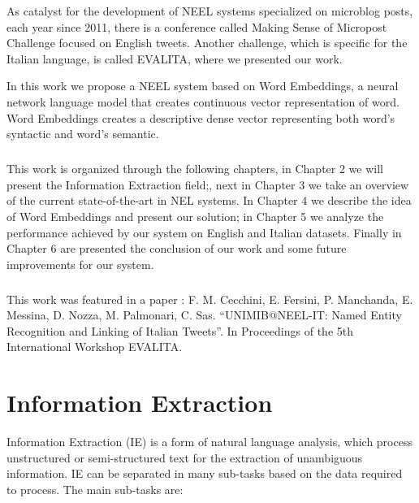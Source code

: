 As catalyst for the development of NEEL systems specialized on microblog posts, each year since 2011, there is a conference called Making Sense of Micropost Challenge focused on English tweets. Another challenge, which is specific for the Italian language, is called EVALITA, where we presented our work.

In this work we propose a NEEL system based on Word Embeddings, a neural network language model that creates continuous vector representation of word. Word Embeddings creates a descriptive dense vector representing both word's syntactic and word's semantic. 

\paragraph{}
This work is organized through the following chapters, in Chapter 2 we will present the Information Extraction field;, next in Chapter 3 we take an overview of the current state-of-the-art in NEL systems. In Chapter 4 we describe the idea of Word Embeddings and present our solution; in Chapter 5 we analyze the performance achieved by our system on English and Italian datasets. Finally in Chapter 6 are presented the conclusion of our work and some future improvements for our system.

\paragraph{}
This work was featured in a paper \cite{cecchiniunimib}: F. M. Cecchini, E. Fersini, P. Manchanda, E. Messina, D. Nozza, M. Palmonari, C. Sas. “UNIMIB@NEEL-IT: Named Entity Recognition and Linking of Italian Tweets”. In Proceedings of the 5th International Workshop EVALITA. 



\chapter{Information Extraction}
Information Extraction (IE) is a form of natural language analysis, which process unstructured or semi-structured text for the extraction of unambiguous information. IE can be separated in many sub-tasks based on the data required to process. The main sub-tasks are:


